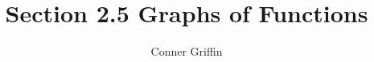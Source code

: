 \documentclass{ximera}
\title{Section 2.5 Graphs of Functions}
\author{Conner Griffin}
\begin{document}
\begin{abstract}
    
\end{abstract}
\maketitle












\end{document}
